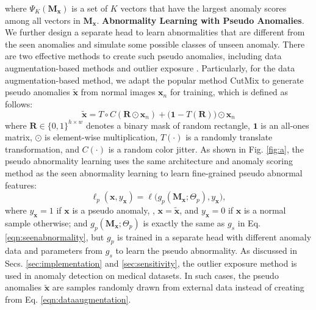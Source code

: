 \documentclass[10pt,twocolumn,letterpaper]{article}
\newcommand{\xvec}{{\mathbf{x}}}
\newcommand{\yxvec}{{y_{\mathbf{x}}}}
\begin{document}
where $\Psi_K(\mathbf{M}_{\xvec})$ is a set of $K$ vectors that have the largest anomaly scores among all vectors in $\mathbf{M}_{\xvec}$. 
\textbf{Abnormality Learning with Pseudo Anomalies}.
We further design a separate head to learn abnormalities that are different from the seen anomalies and simulate some possible classes of unseen anomaly.  
There are two effective methods to create such pseudo anomalies, including data augmentation-based methods \cite{li2021cutpaste,tack2020csi} and outlier exposure \cite{hendrycks2018deep,reiss2021panda}. 
Particularly, for the data augmentation-based method,
we adapt the popular method CutMix \cite{yun2019cutmix} to generate pseudo anomalies $\tilde{\mathbf{x}}$ from normal images $\mathbf{x}_n$ for training, which is defined as follows: 
\begin{equation}\label{eqn:dataaugmentation}
    \tilde{\mathbf{x}}= T\circ C(\mathbf{R}\odot \mathbf{x}_n) + \big(\mathbf{1}-T(\mathbf{R})\big) \odot \mathbf{x}_n
\end{equation}
where $\mathbf{R} \in \{0, 1\}^{h\times w}$ denotes a binary mask of random rectangle, $\mathbf{1}$ is an all-ones matrix, $\odot$ is element-wise multiplication, $T(\cdot)$ is a randomly translate transformation, and $C(\cdot)$ is a random color jitter. 
As shown in Fig. \ref{fig:a}, the pseudo abnormality learning uses the same architecture and anomaly scoring method as the seen abnormality learning to learn fine-grained pseudo abnormal features:
\begin{equation}\label{eqn:pseudoanomaly}
    \ell_{p}(\xvec, y_{\xvec}) = \ell\big(g_p(\mathbf{M}_{\xvec};\Theta_p), y_{\xvec}\big),
\end{equation}
where $\yxvec = 1$ if $\xvec$ is a pseudo anomaly, \ie, $\xvec=\tilde{\xvec}$, and $\yxvec = 0$ if $\xvec$ is a normal sample otherwise; and $g_p(\mathbf{M}_{\xvec};\Theta_p)$ is exactly the same as $g_s$ in Eq. \eqref{eqn:seenabnormality}, but $g_p$ is trained in a separate head with different anomaly data and parameters from $g_s$
to learn the pseudo abnormality. As discussed in Secs. \ref{sec:implementation} and \ref{sec:sensitivity}, the outlier exposure method \cite{hendrycks2018deep} is used in anomaly detection on medical datasets. In such cases, the pseudo anomalies $\tilde{\mathbf{x}}$ are samples randomly drawn from external data instead of creating from Eq. \eqref{eqn:dataaugmentation}.
\end{document}
